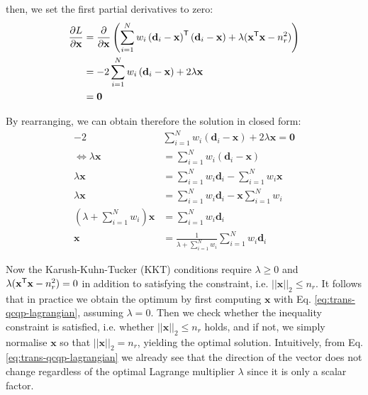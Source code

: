 then, we set the first partial derivatives to zero: 
\begin{equation}
	\begin{aligned}	
		\frac{\partial L}{\partial \mathbf{x}} &= \frac{\partial }{\partial \mathbf{x}} \left( \sum_{i=1}^{N} w_i \left(\mathbf{d}_i - \mathbf{x}\right)^{\mathsf{T}} \left(\mathbf{d}_i - \mathbf{x}\right) + \lambda (
		\mathbf{x}^{\mathsf{T}} \mathbf{x} - n_r^2) \right)\\
		&= - 2\sum_{i=1}^{N} w_i \left(\mathbf{d}_i - \mathbf{x}\right) + 2 \lambda \mathbf{x}\\
		&= \mathbf{0}\\
	\end{aligned}
\end{equation}


By rearranging, we can obtain therefore the solution in closed form:
\begin{equation}
	\label{eq:trans-qcqp-lagrangian}
	\begin{aligned}	
		-2  &\sum_{i=1}^{N}  w_i \left(\mathbf{d}_i - \mathbf{x}\right) + 2 \lambda \mathbf{x} = \mathbf{0}\\
		\iff \lambda \mathbf{x} &= \sum_{i=1}^{N} w_i \left(\mathbf{d}_i - \mathbf{x}\right)\\
		\lambda \mathbf{x} &= \sum_{i=1}^{N}  w_i \mathbf{d}_i  - \sum_{i=1}^{N}  w_i \mathbf{x}\\
		\lambda \mathbf{x} &= \sum_{i=1}^{N}  w_i \mathbf{d}_i  - \mathbf{x} \sum_{i=1}^{N}  w_i\\
		\left( \lambda + \sum_{i=1}^{N}  w_i \right) \mathbf{x} &= \sum_{i=1}^{N} w_i \mathbf{d}_i \\
		\mathbf{x} &= \frac{1}{\lambda + \sum_{i=1}^{N}  w_i} \sum_{i=1}^{N} w_i \mathbf{d}_i 
	\end{aligned}
\end{equation}

Now the Karush-Kuhn-Tucker (KKT) conditions require $\lambda \geq 0$ and $\lambda (
\mathbf{x}^{\mathsf{T}} \mathbf{x} - n_r^2) = 0$ in addition to satisfying the constraint, i.e. $|| \mathbf{x}||_2 \leq n_r$. It follows that in practice we obtain the optimum by first computing $\mathbf{x}$ with Eq. \ref{eq:trans-qcqp-lagrangian}, assuming $\lambda = 0$. Then we check whether the inequality constraint is satisfied, i.e. whether $|| \mathbf{x}||_2 \leq n_r$ holds, and if not, we simply normalise $\mathbf{x}$ so that $|| \mathbf{x}||_2 = n_r$, yielding the optimal solution. Intuitively, from Eq. \ref{eq:trans-qcqp-lagrangian} we already see that the direction of the vector does not change regardless of the optimal Lagrange multiplier $\lambda$ since it is only a scalar factor.  

